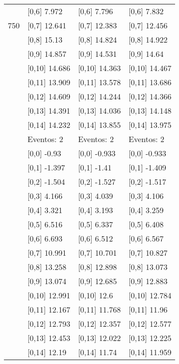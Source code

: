 \begin{table}
\begin{tabular}[t]{llll}
 & {}[0,6] 7.972 & {}[0,6] 7.796 & {}[0,6] 7.832\\
750 & {}[0,7] 12.641 & {}[0,7] 12.383 & {}[0,7] 12.456\\
\addlinespace
 & {}[0,8] 15.13 & {}[0,8] 14.824 & {}[0,8] 14.922\\
 & {}[0,9] 14.857 & {}[0,9] 14.531 & {}[0,9] 14.64\\
 & {}[0,10] 14.686 & {}[0,10] 14.363 & {}[0,10] 14.467\\
 & {}[0,11] 13.909 & {}[0,11] 13.578 & {}[0,11] 13.686\\
 & {}[0,12] 14.609 & {}[0,12] 14.244 & {}[0,12] 14.366\\
\addlinespace
 & {}[0,13] 14.391 & {}[0,13] 14.036 & {}[0,13] 14.148\\
 & {}[0,14] 14.232 & {}[0,14] 13.855 & {}[0,14] 13.975\\
 & Eventos:  2 & Eventos:  2 & Eventos:  2\\
 & {}[0,0] -0.93 & {}[0,0] -0.933 & {}[0,0] -0.933\\
 & {}[0,1] -1.397 & {}[0,1] -1.41 & {}[0,1] -1.409\\
\addlinespace
 & {}[0,2] -1.504 & {}[0,2] -1.527 & {}[0,2] -1.517\\
 & {}[0,3] 4.166 & {}[0,3] 4.039 & {}[0,3] 4.106\\
 & {}[0,4] 3.321 & {}[0,4] 3.193 & {}[0,4] 3.259\\
 & {}[0,5] 6.516 & {}[0,5] 6.337 & {}[0,5] 6.408\\
 & {}[0,6] 6.693 & {}[0,6] 6.512 & {}[0,6] 6.567\\
\addlinespace
1000 & {}[0,7] 10.991 & {}[0,7] 10.701 & {}[0,7] 10.827\\
 & {}[0,8] 13.258 & {}[0,8] 12.898 & {}[0,8] 13.073\\
 & {}[0,9] 13.074 & {}[0,9] 12.685 & {}[0,9] 12.883\\
 & {}[0,10] 12.991 & {}[0,10] 12.6 & {}[0,10] 12.784\\
 & {}[0,11] 12.167 & {}[0,11] 11.768 & {}[0,11] 11.96\\
\addlinespace
 & {}[0,12] 12.793 & {}[0,12] 12.357 & {}[0,12] 12.577\\
 & {}[0,13] 12.453 & {}[0,13] 12.022 & {}[0,13] 12.225\\
 & {}[0,14] 12.19 & {}[0,14] 11.74 & {}[0,14] 11.959\\
\bottomrule
\end{tabular}
\end{table}
